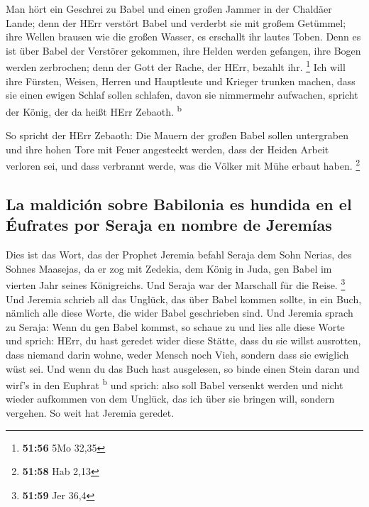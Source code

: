  Man hört ein Geschrei zu Babel und einen großen Jammer
in der Chaldäer Lande;  denn der HErr verstört Babel und
verderbt sie mit großem Getümmel; ihre Wellen brausen wie die großen
Wasser, es erschallt ihr lautes Toben.  Denn es ist über
Babel der Verstörer gekommen, ihre Helden werden gefangen, ihre Bogen
werden zerbrochen; denn der Gott der Rache, der HErr, bezahlt ihr.
\footnote{\textbf{51:56} 5Mo 32,35}  Ich will ihre
Fürsten, Weisen, Herren und Hauptleute und Krieger trunken machen, dass
sie einen ewigen Schlaf sollen schlafen, davon sie nimmermehr aufwachen,
spricht der König, der da heißt HErr Zebaoth. \textsuperscript{b}

 So spricht der HErr Zebaoth: Die Mauern der großen Babel
sollen untergraben und ihre hohen Tore mit Feuer angesteckt werden, dass
der Heiden Arbeit verloren sei, und dass verbrannt werde, was die Völker
mit Mühe erbaut haben. \footnote{\textbf{51:58} Hab 2,13}

\hypertarget{la-maldiciuxf3n-sobre-babilonia-es-hundida-en-el-uxe9ufrates-por-seraja-en-nombre-de-jeremuxedas}{%
\subsection{La maldición sobre Babilonia es hundida en el Éufrates por
Seraja en nombre de
Jeremías}\label{la-maldiciuxf3n-sobre-babilonia-es-hundida-en-el-uxe9ufrates-por-seraja-en-nombre-de-jeremuxedas}}

 Dies ist das Wort, das der Prophet Jeremia befahl Seraja
dem Sohn Nerias, des Sohnes Maasejas, da er zog mit Zedekia, dem König
in Juda, gen Babel im vierten Jahr seines Königreichs. Und Seraja war
der Marschall für die Reise. \footnote{\textbf{51:59} Jer 36,4}
 Und Jeremia schrieb all das Unglück, das über Babel
kommen sollte, in ein Buch, nämlich alle diese Worte, die wider Babel
geschrieben sind.  Und Jeremia sprach zu Seraja: Wenn du
gen Babel kommst, so schaue zu und lies alle diese Worte 
und sprich: HErr, du hast geredet wider diese Stätte, dass du sie willst
ausrotten, dass niemand darin wohne, weder Mensch noch Vieh, sondern
dass sie ewiglich wüst sei.  Und wenn du das Buch hast
ausgelesen, so binde einen Stein daran und wirf's in den Euphrat
\textsuperscript{b}  und sprich: also soll Babel versenkt
werden und nicht wieder aufkommen von dem Unglück, das ich über sie
bringen will, sondern vergehen. So weit hat Jeremia geredet.

